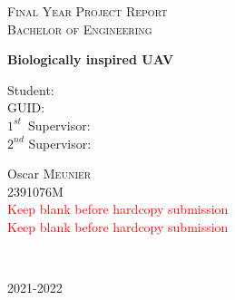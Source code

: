 \documentclass[
12pt, %
oneside, %
singlespacing, %
parskip, %
]{article} %
\newcommand{\thesistitle}{Biologically inspired UAV} %
\newcommand{\GUID}{2391076M}%
\newcommand{\student}{Oscar \textsc{Meunier}} %
\newcommand{\firstsupervisor}{\textcolor{red}{\tiny Keep blank before hardcopy submission}} %
\newcommand{\secondsupervisor} {\textcolor{red}{\tiny Keep blank before hardcopy submission}}%
\begin{document}
\pagestyle{plain} %


\begin{titlepage}
\begin{center}

\textsc{\Large Final Year Project Report\\Bachelor of Engineering
}\\[2cm] %

{\huge \bfseries \thesistitle\par}\vspace{3cm}%

\begin{minipage}[t]{0.4\textwidth}
\begin{flushleft} \huge
Student:\\
\vspace*{.02\textheight}
GUID:\\
\vspace*{.02\textheight}
$1^{st}$\, Supervisor:\\
\vspace*{.02\textheight}
$2^{nd}$ Supervisor:\\
\end{flushleft}
\end{minipage}
\begin{minipage}[t]{0.4\textwidth}
\begin{flushright} \huge
\student\\
\vspace*{.02\textheight}
\GUID\\
\vspace*{.02\textheight}
\firstsupervisor\\
\vspace*{.02\textheight}
\secondsupervisor\\
\end{flushright}
\end{minipage}\\[3cm]

 
\vfill

{\huge 2021-2022}\\[2cm] %
 
\end{center}
\end{titlepage}
\end{document}
